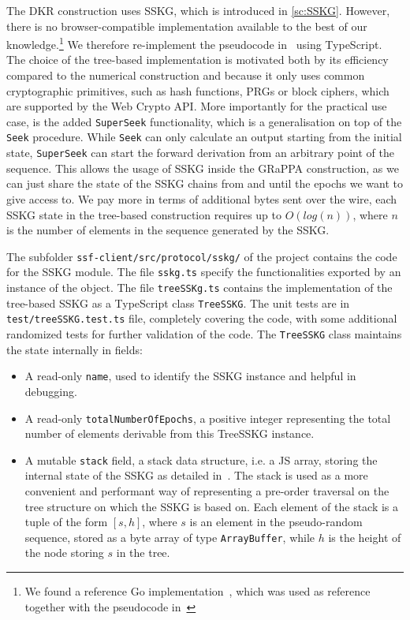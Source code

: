 The DKR construction uses SSKG, which is introduced in \cref{sc:SSKG}.
However, there is no browser-compatible implementation available to the best of our knowledge.\footnote{We found a reference Go implementation~\cite{SSKGGo}, which was used as reference together with the pseudocode in~\cite{ESORICS:MarPoe14}}
We therefore re-implement the pseudocode in~\cite{ESORICS:MarPoe14} using TypeScript.
The choice of the tree-based implementation is motivated both by its efficiency
compared to the numerical construction and because it only uses common cryptographic
primitives, such as hash functions, PRGs or block ciphers, which are supported by the Web Crypto API.
More importantly for the practical use case, is the added \texttt{SuperSeek}
functionality, which is a generalisation on top of the \texttt{Seek} procedure.
While \texttt{Seek} can only calculate an output starting from the initial state, 
\texttt{SuperSeek} can start the forward derivation from an arbitrary point of the sequence.
This allows the usage of SSKG inside the GRaPPA construction,
as we can just share the state of the SSKG chains from and until
the epochs we want to give access to. 
We pay more in terms of additional bytes sent over the wire, each SSKG
state in the tree-based construction requires up to $O(log(n))$,
where $n$ is the number of elements in the sequence generated by the SSKG.

The subfolder \texttt{ssf-client/src/protocol/sskg/} of the project contains the code for the SSKG module.
The file \texttt{sskg.ts} specify the functionalities exported by an instance of the object.
The file \texttt{treeSSKg.ts} contains the implementation of the tree-based SSKG
as a TypeScript class \texttt{TreeSSKG}. The unit tests are in \texttt{test/treeSSKG.test.ts} file,
completely covering the code, with some additional randomized tests for further validation of the code.
The \texttt{TreeSSKG} class maintains the state internally in fields:
\begin{itemize}
    \item A read-only \texttt{name}, used to identify the SSKG instance and helpful in debugging.
    \item A read-only \texttt{totalNumberOfEpochs}, a positive integer representing the total number of elements derivable from this TreeSSKG instance.
    \item A mutable \texttt{stack} field, a stack data structure, i.e. a JS array, storing the internal state of the SSKG as detailed in~\cite{ESORICS:MarPoe14}. The stack is used as a more convenient and performant way of representing a pre-order traversal on the tree structure on which the SSKG is based on. Each element of the stack is a tuple of the form $[s, h]$, where $s$ is an element in the pseudo-random sequence, stored as a byte array of type \texttt{ArrayBuffer}, while $h$ is the height of the node storing $s$ in the tree.  
\end{itemize}

